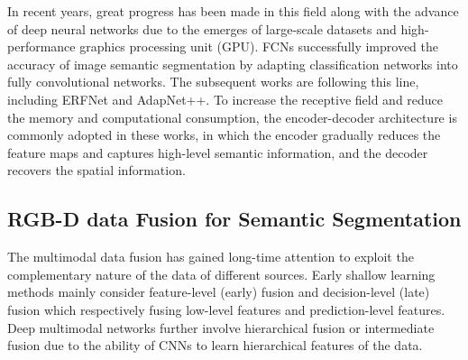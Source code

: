 \documentclass[letterpaper, 10 pt, conference]{ieeeconf}
\begin{document}
	In recent years, great progress has been made in this field along with the advance of deep neural networks due to the emerges of large-scale datasets and high-performance graphics processing unit (GPU). FCNs\cite{shelhamer2017fully} successfully improved the accuracy of image semantic
	segmentation by adapting classification networks into fully convolutional networks. The subsequent works\cite{chen2018encoder, li2019gff,zhao2016pyramid} are following this line, including ERFNet\cite{romera2017erfnet} and AdapNet++\cite{valada2019self}. To increase the receptive field and reduce the memory and computational consumption, the encoder-decoder architecture is commonly adopted in these works, in which the encoder gradually reduces the feature maps and captures high-level semantic information, and the decoder recovers the spatial information.
	\subsection{RGB-D data Fusion for Semantic Segmentation}
	The multimodal data fusion has gained long-time attention to exploit the complementary nature of the data of different sources\cite{atrey2010multimodal,ramachandram2017deep}. Early shallow learning methods mainly consider feature-level (early) fusion and decision-level (late) fusion which respectively fusing low-level features and prediction-level features\cite{atrey2010multimodal}. Deep multimodal networks further involve hierarchical fusion or intermediate fusion\cite{ramachandram2017deep,valada2019self} due to the ability of CNNs to learn hierarchical features of the data.
	
\end{document}
